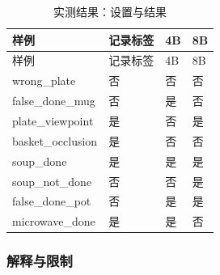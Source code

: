 \FloatBarrier\begingroup\small\setlength{\tabcolsep}{2.5pt}
\begin{longtable}[]{@{}
  >{\raggedright\arraybackslash}p{}
  >{\raggedright\arraybackslash}p{}
  >{\raggedright\arraybackslash}p{}
  >{\raggedright\arraybackslash}p{}@{}}
\caption{实测结果：设置与结果}\label{tab:s09-3}\tabularnewline
\toprule\noalign{}
\begin{minipage}[b]{\linewidth}\raggedright
样例
\end{minipage} & \begin{minipage}[b]{\linewidth}\raggedright
记录标签
\end{minipage} & \begin{minipage}[b]{\linewidth}\raggedright
4B
\end{minipage} & \begin{minipage}[b]{\linewidth}\raggedright
8B
\end{minipage} \\
\midrule\noalign{}
\endfirsthead
\toprule\noalign{}
\begin{minipage}[b]{\linewidth}\raggedright
样例
\end{minipage} & \begin{minipage}[b]{\linewidth}\raggedright
记录标签
\end{minipage} & \begin{minipage}[b]{\linewidth}\raggedright
4B
\end{minipage} & \begin{minipage}[b]{\linewidth}\raggedright
8B
\end{minipage} \\
\midrule\noalign{}
\endhead
\bottomrule\noalign{}
\endlastfoot
wrong\_plate & 否 & 否 & 否 \\
false\_done\_mug & 否 & 是 & 否 \\
plate\_viewpoint & 是 & 否 & 是 \\
basket\_occlusion & 是 & 否 & 否 \\
soup\_done & 是 & 是 & 是 \\
soup\_not\_done & 否 & 否 & 是 \\
false\_done\_pot & 否 & 是 & 是 \\
microwave\_done & 是 & 是 & 否 \\
\end{longtable}\endgroup

\subsubsection{解释与限制}\label{s09-detail-7}

